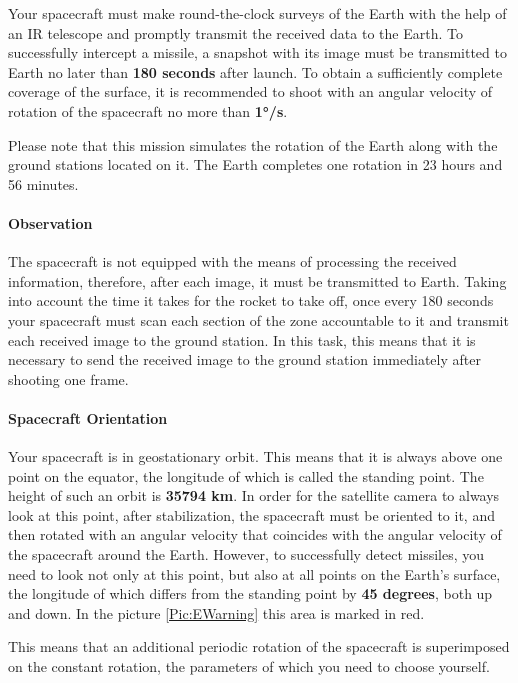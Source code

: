 \documentclass[12pt,a4paper]{article}
\begin{document}
Your spacecraft must make round-the-clock surveys of the Earth with the help of an IR telescope and promptly transmit the received data to the Earth. To successfully intercept a missile, a snapshot with its image must be transmitted to Earth no later than \textbf{180 seconds} after launch. To obtain a sufficiently complete coverage of the surface, it is recommended to shoot with an angular velocity of rotation of the spacecraft no more than \textbf{1°/s}.

Please note that this mission simulates the rotation of the Earth along with the ground stations located on it. The Earth completes one rotation in 23 hours and 56 minutes.

\paragraph{Observation}

The spacecraft is not equipped with the means of processing the received information, therefore, after each image, it must be transmitted to Earth. Taking into account the time it takes for the rocket to take off, once every 180 seconds your spacecraft must scan each section of the zone accountable to it and transmit each received image to the ground station. In this task, this means that it is necessary to send the received image to the ground station immediately after shooting one frame.

\paragraph{Spacecraft Orientation}

Your spacecraft is in geostationary orbit. This means that it is always above one point on the equator, the longitude of which is called the standing point. The height of such an orbit is \textbf{35794 km}. In order for the satellite camera to always look at this point, after stabilization, the spacecraft must be oriented to it, and then rotated with an angular velocity that coincides with the angular velocity of the spacecraft around the Earth. However, to successfully detect missiles, you need to look not only at this point, but also at all points on the Earth's surface, the longitude of which differs from the standing point by \textbf{45 degrees}, both up and down. In the picture \ref{Pic:EWarning} this area is marked in red.

This means that an additional periodic rotation of the spacecraft is superimposed on the constant rotation, the parameters of which you need to choose yourself.
\end{document}
